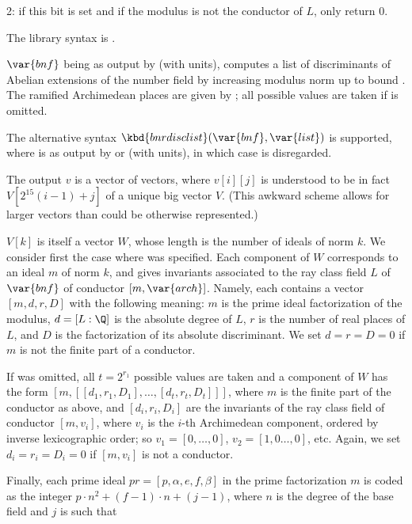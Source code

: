 \item 2: if this bit is set and if the modulus is not the conductor of $L$,
only return 0.

The library syntax is .

\label{se:bnrdisclist}
$\var{bnf}$ being as output by  (with units), computes a
list of discriminants of Abelian extensions of the number field by increasing
modulus norm up to bound . The ramified Archimedean places are
given by ; all possible values are taken if  is omitted.

The alternative syntax $\kbd{bnrdisclist}(\var{bnf},\var{list})$ is
supported, where  is as output by  or
 (with units), in which case  is disregarded.

The output $v$ is a vector of vectors, where $v[i][j]$ is understood to be in
fact $V[2^{15}(i-1)+j]$ of a unique big vector $V$. (This awkward scheme
allows for larger vectors than could be otherwise represented.)

$V[k]$ is itself a vector $W$, whose length is the number of ideals of norm
$k$. We consider first the case where  was specified. Each
component of $W$ corresponds to an ideal $m$ of norm $k$, and
gives invariants associated to the ray class field $L$ of $\var{bnf}$ of
conductor $[m, \var{arch}]$. Namely, each contains a vector $[m,d,r,D]$ with
the following meaning: $m$ is the prime ideal factorization of the modulus,
$d = [L:\Q]$ is the absolute degree of $L$, $r$ is the number of real places
of $L$, and $D$ is the factorization of its absolute discriminant. We set $d
= r = D = 0$ if $m$ is not the finite part of a conductor.

If  was omitted, all $t = 2^{r_1}$ possible values are taken and a
component of $W$ has the form $[m, [[d_1,r_1,D_1], \dots, [d_t,r_t,D_t]]]$,
where $m$ is the finite part of the conductor as above, and
$[d_i,r_i,D_i]$ are the invariants of the ray class field of conductor
$[m,v_i]$, where $v_i$ is the $i$-th Archimedean component, ordered by
inverse lexicographic order; so $v_1 = [0,\dots,0]$, $v_2 = [1,0\dots,0]$,
etc. Again, we set $d_i = r_i = D_i = 0$ if $[m,v_i]$ is not a conductor.

Finally, each prime ideal $pr = [p,\alpha,e,f,\beta]$ in the prime
factorization $m$ is coded as the integer $p\cdot n^2+(f-1)\cdot n+(j-1)$,
where $n$ is the degree of the base field and $j$ is such that


